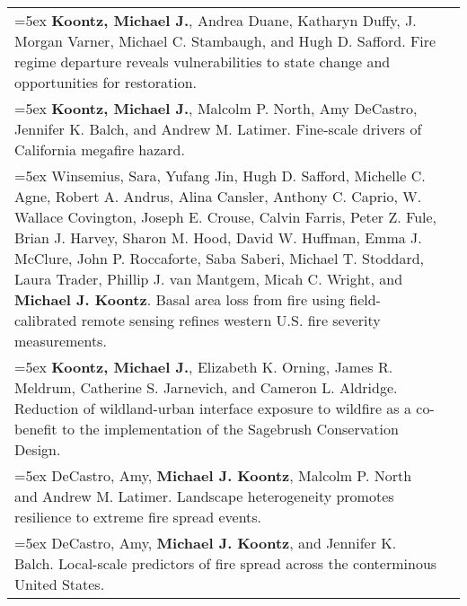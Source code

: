 \begin{longtable}{@{} >{\raggedright}p{5.25in} >{\raggedleft}X @{}}

\hangindent=5ex \textbf{Koontz, Michael J.}, Andrea Duane, Katharyn Duffy, J. Morgan Varner, Michael C. Stambaugh, and Hugh D. Safford. Fire regime departure reveals vulnerabilities to state change and opportunities for restoration. & \tabularnewline

\hangindent=5ex \textbf{Koontz, Michael J.}, Malcolm P. North, Amy DeCastro, Jennifer K. Balch, and Andrew M. Latimer. Fine-scale drivers of California megafire hazard.  & [\textcolor{blue}{\href{https://github.com/mikoontz/megafire-fine-scale-drivers}{GitHub}}] \tabularnewline

\hangindent=5ex Winsemius, Sara, Yufang Jin, Hugh D. Safford, Michelle C. Agne, Robert A. Andrus, Alina Cansler, Anthony C. Caprio, W. Wallace Covington, Joseph E. Crouse, Calvin Farris, Peter Z. Fule, Brian J. Harvey, Sharon M. Hood, David W. Huffman, Emma J. McClure, John P. Roccaforte, Saba Saberi, Michael T. Stoddard, Laura Trader, Phillip J. van Mantgem, Micah C. Wright, and \textbf{Michael J. Koontz}. Basal area loss from fire using field-calibrated remote sensing refines western U.S. fire severity measurements. & \tabularnewline

\hangindent=5ex \textbf{Koontz, Michael J.}, Elizabeth K. Orning, James R. Meldrum, Catherine S. Jarnevich, and Cameron L. Aldridge. Reduction of wildland-urban interface exposure to wildfire as a co-benefit to the implementation of the Sagebrush Conservation Design. & \tabularnewline

\hangindent=5ex DeCastro, Amy, \textbf{Michael J. Koontz}, Malcolm P. North and Andrew M. Latimer. Landscape heterogeneity promotes resilience to extreme fire spread events. & \tabularnewline

\hangindent=5ex DeCastro, Amy, \textbf{Michael J. Koontz}, and Jennifer K. Balch. Local-scale predictors of fire spread across the conterminous United States. & \tabularnewline

% 
% 
% 

\end{longtable}

